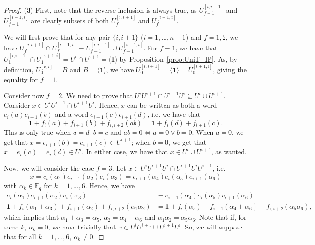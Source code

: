 \documentclass[10pt,a4paper]{amsart}
\newcommand{\FF}{\mathbb{F}}
\begin{document}
\begin{proof}
    $\textbf{(3)}$ 
    First, note that the reverse inclusion is always true, as  $U_{f-1}^{[i,i+1]}$ and $U_{f-1}^{[i+1,i]}$ are clearly subsets of both $U_{f}^{[i,i+1]}$ and $U_{f}^{[i+1,i]}$. 
    
    We will first prove that for any pair $\{i,i+1\}$ ($i=1,\ldots,n-1$) and $f=1,2$, we have $U^{[i,i+1]}_f\cap U^{[i+1,i]}_f = U^{[i,i+1]}_{f-1}\cup U^{[i+1,i]}_{f-1}$.
    For $f=1$, we have that $U^{[i,i+1]}_1\cap U_1^{[i+1,i]} = U^i\cap U^{i+1} = \langle \mathbf{1}\rangle$ by Proposition~\ref{prop:UniT_IP}. As, by definition, $U_0^{[k,l]}=B$ and $B=\langle \mathbf{1}\rangle$, we have $U_0^{[i,i+1]}=\langle \mathbf{1}\rangle = U_0^{[i+1,i]}$, giving the equality for $f=1$.
    
    Consider now $f=2$.
    We need to prove that $U^iU^{i+1}\cap U^{i+1}U^{i} \subseteq   U^i \cup U^{i+1}$.
    Consider $x\in U^iU^{i+1}\cap U^{i+1}U^i$.
    Hence, $x$ can be written as both a word $e_i(a)e_{i+1}(b)$ and a word $e_{i+1}(c)e_{i+1}(d)$, i.e. we have that $$\mathbf{1}+f_i(a)+f_{i+1}(b)+f_{i,i+2}(ab) = \mathbf{1} + f_i(d)+f_{i+1}(c).$$
    This is only true when $a=d$, $b=c$ and $ab=0\Leftrightarrow a=0\vee b=0$.
    When $a=0$, we get that $x=e_{i+1}(b)=e_{i+1}(c)\in U^{i+1}$; when $b=0$, we get that $x=e_i(a)=e_i(d)\in U^i$. In either case, we have that $x\in U^i\cup U^{i+1}$, as wanted.

    Now, we will consider the case $f=3$. Let $x\in U^iU^{i+1}U^i\cap U^{i+1}U^{i}U^{i+1}$, i.e.
    $$x=e_i(\alpha_1)e_{i+1}(\alpha_2)e_{i}(\alpha_3) = e_{i+1}(\alpha_4)e_{i}(\alpha_5)e_{i+1}(\alpha_6)$$ with $\alpha_k\in \FF_q$ for $k=1,\ldots,6$. 
    Hence, we have 
    \begin{align*}
        e_i(\alpha_1)e_{i+1}(\alpha_2)e_{i}(\alpha_3) &= e_{i+1}(\alpha_4)e_{i}(\alpha_5)e_{i+1}(\alpha_6)\\
        \mathbf{1} + f_i(\alpha_1+\alpha_3)+f_{i+1}(\alpha_2)+f_{i,i+2}(\alpha_1\alpha_2)&=\mathbf{1}+f_i(\alpha_5)+f_{i+1}(\alpha_4+\alpha_6)+f_{i,i+2}(\alpha_5\alpha_6),
    \end{align*}
    which implies that $\alpha_1+\alpha_3=\alpha_5$, $\alpha_2=\alpha_4+\alpha_6$ and $\alpha_1\alpha_2=\alpha_5\alpha_6$.
    Note that if, for some $k$, $\alpha_k=0$, we have trivially that $x\in U^iU^{i+1}\cup U^{i+1}U^i$. So, we will suppose that for all $k=1,\ldots,6$, $\alpha_k\neq 0$.
    

\end{proof}
\end{document}
